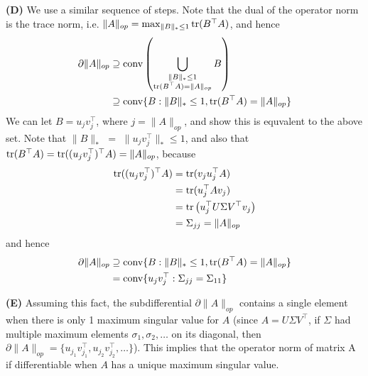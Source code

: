 \textbf{(D) } 
We use a similar sequence of steps. Note that the dual of the operator norm is the trace norm, i.e.
$\|A\|_{op} = \max_{\|B\|_* \leq 1} \operatorname{tr}(B^\top A)$, and hence
\begin{align}
    \partial \|A\|_{op} &\supseteq \text{conv}\left( \bigcup_{\substack{\|B\|_* \leq 1
    \\ \operatorname{tr}(B^\top A) = \|A\|_{op}}} B \right)\\
    &\supseteq \text{conv}\{B : \|B\|_* \leq 1, \operatorname{tr}(B^\top A) = \|A\|_{op} \}
\end{align}
We can let $B = u_j v_j^\top$, where $j = \|A\|_{op}$, and show this is
equvalent to the above set. Note that $\|B\|_*$ $=$ $\|u_j v_j^\top\|_* \leq
1$, and also that $\operatorname{tr}(B^\top A) = \operatorname{tr}((u_j v_j^\top)^\top A) = \|A\|_{op}$,
because
\begin{align}
    \operatorname{tr}((u_j v_j^\top)^\top A) &= \operatorname{tr}(v_j u_j^\top A)\\
                               &= \operatorname{tr}(u_j^\top A v_j) \\
                               &= \operatorname{tr}\left(u_j^\top U \Sigma V^\top v_j \right)\\
                               &= \Sigma_{jj} = \|A\|_{op}
\end{align}
and hence
\begin{align}
    \partial \|A\|_{op} &\supseteq \text{conv}\{B : \|B\|_* \leq 1, \operatorname{tr}(B^\top A) = \|A\|_{op} \}\\
                        &= \text{conv}\{u_j v_j^\top : \Sigma_{jj} = \Sigma_{11} \}
\end{align}


\textbf{(E) }
Assuming this fact, the subdifferential $\partial \|A\|_{op}$ contains a single
element when there is only 1 maximum singular value for $A$ (since $A = U
\Sigma V^\top$, if $\Sigma$ had multiple maximum elements $\sigma_1, \sigma_2,
\ldots$ on its diagonal, then $\partial \|A\|_{op} = \{ u_{j_1} v_{j_1}^\top,
u_{j_2} v_{j_2}^\top, \ldots \}$). This implies that the operator norm of matrix A
if differentiable when $A$ has a unique maximum singular value.


